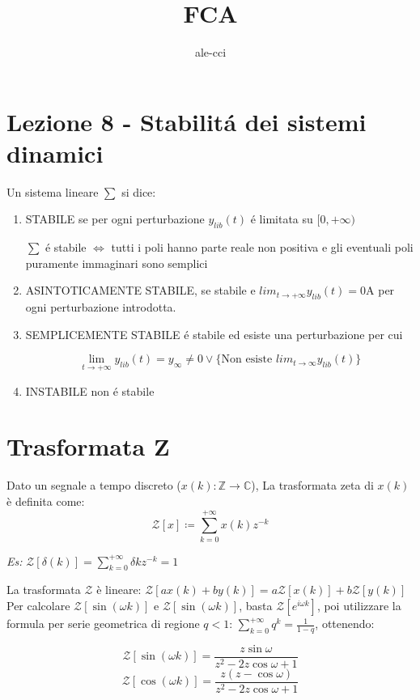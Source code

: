 \documentclass{article}
\title{FCA}
\author{ale-cci}
\begin{document}
\maketitle
\newpage
\section{Lezione 8 - Stabilit\'a dei sistemi dinamici}
Un sistema lineare $\sum$ si dice:
\begin{enumerate}
    \item STABILE se per ogni perturbazione $y_{lib}(t)$ \'e limitata su $[0,+\infty)$

        $\sum$ \'e stabile $\Leftrightarrow$ tutti i poli hanno parte reale non positiva e gli eventuali poli puramente immaginari sono semplici
    \item ASINTOTICAMENTE STABILE, se stabile e $lim_{t \to+\infty} y_{lib}(t) = 0$A per ogni perturbazione introdotta.
    \item SEMPLICEMENTE STABILE \'e stabile ed esiste una perturbazione  per cui

    \[ \lim_{t \to +\infty} y_{lib}(t) = y_{\infty} \neq 0 \lor \big\{\text{Non esiste $lim_{t\to\infty} y_{lib}(t)$}\big\} \]
    \item INSTABILE non \'e stabile
\end{enumerate}

\newpage
\section{Trasformata Z}
Dato un segnale a tempo discreto ($x(k) : \mathbb{Z} \to \mathbb{C}$), La trasformata zeta di $x(k)$ \`e definita come:
\[ \mathcal{Z}[x] \coloneqq \sum\limits^{+\infty}_{k=0} x(k) z^{-k}\]

\textit{Es:}
$ \mathcal{Z}[\delta(k)] = \sum\limits_{k=0}^{+\infty} \delta{k}z^{-k} = 1 $

La trasformata $\mathcal{Z}$ \`e lineare:
$ \mathcal{Z}[ax(k) + by(k)] = a\mathcal{Z}[x(k)] + b\mathcal{Z}[y(k)] $\\

Per calcolare $\mathcal{Z}[\sin(\omega k)]$ e $\mathcal{Z}[\sin(\omega k)]$, basta $\mathcal{Z}[e^{i\omega k}]$, poi utilizzare la formula per serie geometrica di regione $q < 1$: $\sum\limits_{k=0}^{+\infty} q^k = \frac{1}{1-q} $, ottenendo:

\[ \mathcal{Z}[\sin (\omega k)] = \frac{z\sin\omega}{z^2 - 2z\cos \omega +1} \]
\[ \mathcal{Z}[\cos (\omega k)] = \frac{z(z - \cos\omega)}{z^2 - 2z\cos \omega +1} \]
\end{document}
